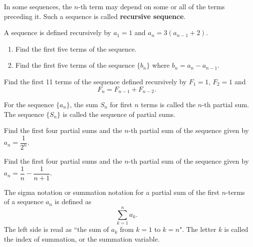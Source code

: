 \begin{definition}
  In some sequences, the $n$-th term may depend on some or all of the terms preceding it. Such a sequence is called \textbf{recursive sequence}.  
\end{definition}

\begin{example}
   A sequence is defined recursively by $a_1=1$ and $a_n=3(a_{n-1}+2)$.
   \begin{enumerate}
       \item Find the first five terms of the sequence.
       \item Find the first five terms of the sequence $\{b_n\}$ where $b_n=a_n-a_{n-1}$.
   \end{enumerate}
\end{example}

\begin{example}
    Find the first 11 terms of the sequence defined recursively by $F_1=1$, $F_2=1$ and 
    $$F_n=F_{n-1} + F_{n-2}.$$
\end{example}


\newpage
\begin{definition}
For the sequence $\{a_n\}$, the sum $S_n$ for first $n$ terms is called the $n$-th partial sum. The sequence $\{S_n\}$ is called the sequence of partial sums.
\end{definition}


\begin{example}
    Find the first four partial sums and the $n$-th partial sum of the sequence given by $a_n=\dfrac{1}{2^n}$.
\end{example}


\begin{example}
    Find the first four partial sums and the $n$-th partial sum of the sequence given by $a_n=\dfrac{1}{n}-\dfrac{1}{n+1}$.
\end{example}

\newpage

\begin{definition}
    The sigma notation or summation notation for a partial sum of the first $n$-terms of a sequence $a_n$ is defined as
    \[\sum_{k=1}^na_k.\]
    The left side is read as ``the sum of $a_k$ from $k=1$ to $k=n$".  The letter
$k$ is called the index of summation, or the summation variable.
\end{definition}

